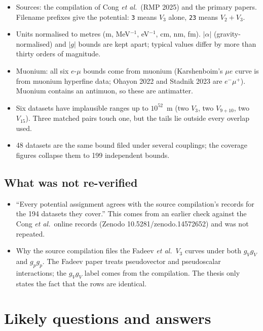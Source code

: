 \documentclass[11pt,a4paper]{article}
\begin{document}
\begin{itemize}[leftmargin=1.2em]
\item Sources: the compilation of Cong \textit{et al.}\ (RMP 2025) and the
primary papers. Filename prefixes give the potential: \texttt{3} means
$V_3$ alone, \texttt{23} means $V_2+V_3$.
\item Units normalised to metres (m, MeV$^{-1}$, eV$^{-1}$, cm, nm, fm).
$|\alpha|$ (gravity-normalised) and $|g|$ bounds are kept apart; typical
values differ by more than thirty orders of magnitude.
\item Muonium: all six $e$-$\mu$ bounds come from muonium (Karshenboim's
$\mu e$ curve is from muonium hyperfine data; Ohayon 2022 and Stadnik 2023
are $e^-\mu^+$). Muonium contains an antimuon, so these are antimatter.
\item Six datasets have implausible ranges up to $10^{52}$~m (two $V_3$,
two $V_{9+10}$, two $V_{15}$). Three matched pairs touch one, but the
tails lie outside every overlap used.
\item 48 datasets are the same bound filed under several couplings; the
coverage figures collapse them to 199 independent bounds.
\end{itemize}

\subsection{What was not re-verified}
\label{sec:unverified}

\begin{itemize}[leftmargin=1.2em]
\item ``Every potential assignment agrees with the source compilation's
records for the 194 datasets they cover.'' This comes from an earlier
check against the Cong \textit{et al.}\ online records (Zenodo
10.5281/zenodo.14572652) and was not repeated.
\item Why the source compilation files the Fadeev \textit{et al.}\ $V_3$
curves under both $g_Vg_V$ and $g_pg_p$. The Fadeev paper treats
pseudovector and pseudoscalar interactions; the $g_Vg_V$ label comes from
the compilation. The thesis only states the fact that the rows are
identical.
\end{itemize}

\section{Likely questions and answers}
\label{part:qa}
\end{document}
